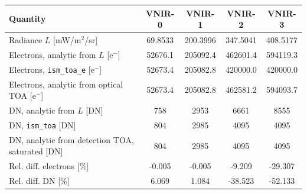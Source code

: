 \begin{tabular}{lcccc}
\toprule
Quantity & VNIR-0 & VNIR-1 & VNIR-2 & VNIR-3 \\
\midrule
Radiance $L$ [mW/m$^2$/sr] & 69.8533 & 200.3996 & 347.5041 & 408.5177 \\
Electrons, analytic from $L$ [e$^-$] & 52676.1 & 205092.4 & 462601.4 & 594119.3 \\
Electrons, \texttt{ism\_toa\_e} [e$^-$] & 52673.4 & 205082.8 & 420000.0 & 420000.0 \\
Electrons, analytic from optical TOA [e$^-$] & 52673.4 & 205082.8 & 462581.2 & 594093.7 \\
DN, analytic from $L$ [DN] & 758 & 2953 & 6661 & 8555 \\
DN, \texttt{ism\_toa} [DN] & 804 & 2985 & 4095 & 4095 \\
DN, analytic from detection TOA, saturated [DN] & 804 & 2985 & 4095 & 4095 \\
\midrule
Rel. diff. electrons [\%] & -0.005 & -0.005 & -9.209 & -29.307 \\
Rel. diff. DN [\%] & 6.069 & 1.084 & -38.523 & -52.133 \\
\bottomrule
\end{tabular}
